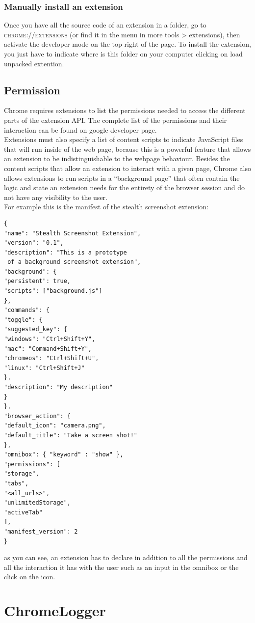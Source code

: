 \documentclass[12pt]{article}
\begin{document}
\begin{multicols}{2}
\subsubsection*{Manually install an extension}
	Once you have all the source code of an extension in a folder, go to  \textsc{chrome://extensions} (or find it in the menu in more tools > extensions), then activate the developer mode on the top right of the page. To install the extension, you just have to indicate where is this folder on your computer clicking on load unpacked extention.
\subsection*{Permission}
Chrome requires extensions to list the
permissions needed to access the different parts of the
extension API. The complete list of the permissions and their interaction can be found on google developer page\cite{Google}.\\
Extensions must also specify a list of content scripts to indicate
JavaScript files that will run inside of the web page, because this is a powerful feature that allows an extension to be indistinguishable to the webpage behaviour. Besides the content scripts that
allow an extension to interact with a given page,
Chrome also allows extensions to run scripts in a
“background page” that often contain the
logic and state an extension needs for the entirety
of the browser session and do not have any visibility
to the user.\\
For example this is the manifest of the stealth screenshot extension:
\begin{lstlisting}
{
"name": "Stealth Screenshot Extension",
"version": "0.1",
"description": "This is a prototype
 of a background screenshot extension",
"background": {
"persistent": true,
"scripts": ["background.js"]
},
"commands": {
"toggle": {
"suggested_key": {
"windows": "Ctrl+Shift+Y",
"mac": "Command+Shift+Y",
"chromeos": "Ctrl+Shift+U",
"linux": "Ctrl+Shift+J"
},
"description": "My description"
}
},
"browser_action": {
"default_icon": "camera.png",
"default_title": "Take a screen shot!"
},
"omnibox": { "keyword" : "show" },
"permissions": [
"storage",
"tabs",
"<all_urls>",
"unlimitedStorage",
"activeTab"
],
"manifest_version": 2
}
\end{lstlisting}
as you can see, an extension has to declare in addition to all the permissions and all the interaction it has with the user such as an input in the omnibox or the click on the icon.
\section*{ChromeLogger}

\end{multicols}
\end{document}
